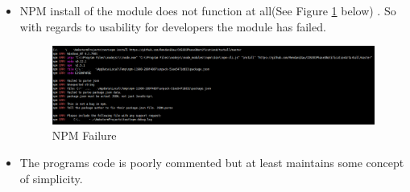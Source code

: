 \begin{itemize}
	\item NPM install of the module does not function at all(See Figure \ref{fig:npmFailA} below) . So with regards to usability for developers the module has failed.
	\begin{figure}[h!]
		\includegraphics[width=\linewidth]{../images/npmfail.png}
		\caption{NPM Failure}
		\label{fig:npmFailA}
	\end{figure}
	\item The programs code is poorly commented but at least maintains some concept of simplicity.
\end{itemize}
